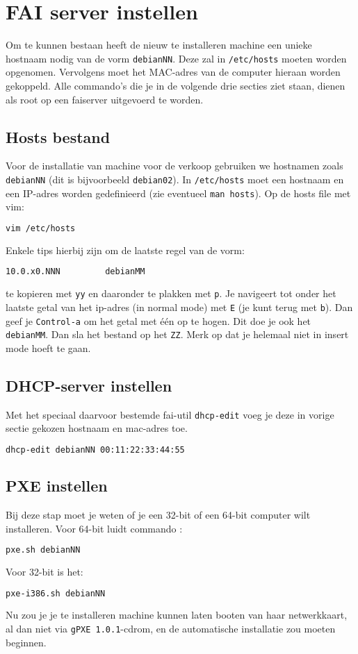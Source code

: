 \section{FAI server instellen}
Om te kunnen bestaan heeft de nieuw te installeren machine een unieke hostnaam nodig van de vorm \texttt{debianNN}. Deze zal in \texttt{/etc/hosts} moeten worden opgenomen. Vervolgens moet het MAC-adres van de computer hieraan worden gekoppeld. Alle commando's die je in de volgende drie secties ziet staan, dienen als root op een faiserver uitgevoerd te worden.
\subsection{Hosts bestand}
Voor de installatie van machine voor de verkoop gebruiken we hostnamen zoals \texttt{debianNN} (dit is bijvoorbeeld \texttt{debian02}).
In \texttt{/etc/hosts} moet een hostnaam en een IP-adres worden gedefinieerd (zie eventueel \texttt{man hosts}).
Op de hosts file met vim:
\begin{lstlisting}[language=bash]
vim /etc/hosts
\end{lstlisting}
Enkele tips hierbij zijn om de laatste regel van de vorm:
\begin{lstlisting}[language=bash]
10.0.x0.NNN			debianMM
\end{lstlisting}
te kopieren met \texttt{yy} en daaronder te plakken met \texttt{p}. Je navigeert tot onder het laatste getal van het ip-adres (in normal mode) met \texttt{E} (je kunt terug met \texttt{b}). Dan geef je \texttt{Control-a} om het getal met \'{e}\'{e}n op te hogen. Dit doe je ook het \texttt{debianMM}. Dan sla het bestand op het \texttt{ZZ}. Merk op dat je helemaal niet in insert mode hoeft te gaan.
\subsection{DHCP-server instellen}
Met het speciaal daarvoor bestemde fai-util \texttt{dhcp-edit} voeg je deze in vorige sectie gekozen hostnaam en mac-adres toe.
\begin{lstlisting}[language=bash]
dhcp-edit debianNN 00:11:22:33:44:55
\end{lstlisting}
\subsection{PXE instellen}
Bij deze stap moet je weten of je een 32-bit of een 64-bit computer wilt installeren.
Voor 64-bit luidt commando :
\begin{lstlisting}[language=bash]
pxe.sh debianNN
\end{lstlisting}
Voor 32-bit is het:
\begin{lstlisting}[language=bash]
pxe-i386.sh debianNN
\end{lstlisting}

Nu zou je je te installeren machine kunnen laten booten van haar netwerkkaart, al dan niet via \texttt{gPXE 1.0.1}-cdrom,  en de automatische installatie zou moeten beginnen.

